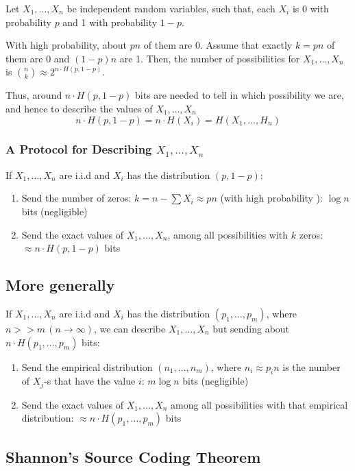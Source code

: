 \documentclass{article}
\begin{document}
Let $X_1,\ldots,X_n$ be independent random variables, such that, each $X_i$ is 0 with probability $p$ and 1 with probability $1-p$.

With high probability, about $pn$ of them are $0$. Assume that exactly $k=pn$ of them are $0$ and $\left(1-p\right)n$ are 1. Then, the number of possibilities for $X_1,\ldots, X_n$ is $\binom{n }{k }\approx 2^{n\cdot H\left(p,1-p\right)}$.

Thus, around $n\cdot H(p,1-p)$ bits are needed to tell in which possibility we are, and hence to describe the values of $X_1,\ldots,X_n$
\[
n\cdot H(p,1-p)= n\cdot H(X_i)=H(X_1,\ldots,H_n)
\]

\subsubsection{A Protocol for Describing $X_1,\ldots,X_n$}
If $X_1,\ldots,X_n$ are i.i.d and $X_i$ has the distribution $\left(p,1-p\right)$:
\begin{enumerate}
    \item Send the number of zeros: $k=n-\sum X_i\approx pn$ (with high probability ): $\log n$ bits (negligible)
    \item Send the exact values of $X_1,\ldots,X_n$, among all possibilities with $k$ zeros: $\approx n\cdot H(p,1-p)$ bits
\end{enumerate}

\subsection{More generally}

If $X_1,\ldots,X_n$ are i.i.d and $X_i$ has the distribution $\left(p_1,\ldots, p_m\right)$, where $n >> m \, \left(n\to \infty\right)$, we can describe $X_1,\ldots, X_n$ but sending about $n\cdot H(p_1,\ldots,p_m)$ bits:
\begin{enumerate}
    \item Send the empirical distribution $\left(n_1,\ldots, n_m\right)$, where $n_i\approx p_i n$ is the number of $X_j$-s that have the value $i$: $m\log n$ bits (negligible)
    \item Send the exact values of $X_1,\ldots, X_n$ among all possibilities with that empirical distribution: $\approx n\cdot H(p_1,\ldots,p_m)$ bits
\end{enumerate}

\subsection{Shannon's Source Coding Theorem}
\end{document}
